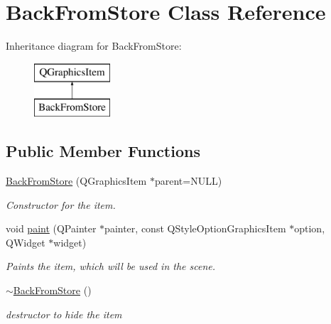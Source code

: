 \hypertarget{class_back_from_store}{\section{Back\-From\-Store Class Reference}
\label{class_back_from_store}
}
Inheritance diagram for Back\-From\-Store\-:\begin{figure}[H]
\begin{center}
\leavevmode
\includegraphics[height=2.000000cm]{class_back_from_store}
\end{center}
\end{figure}
\subsection*{Public Member Functions}
\begin{DoxyCompactItemize}
\item 
\hyperlink{class_back_from_store_a9e92e57e75e179d5929e13d7786bbae6}{Back\-From\-Store} (Q\-Graphics\-Item $\ast$parent=N\-U\-L\-L)
\begin{DoxyCompactList}\small\item\em Constructor for the item. \end{DoxyCompactList}\item 
void \hyperlink{class_back_from_store_a9bd0ae2bf7216a99e030a199df7b1582}{paint} (Q\-Painter $\ast$painter, const Q\-Style\-Option\-Graphics\-Item $\ast$option, Q\-Widget $\ast$widget)
\begin{DoxyCompactList}\small\item\em Paints the item, which will be used in the scene. \end{DoxyCompactList}\item 
\hypertarget{class_back_from_store_ad9766708c35f543f9b3ec96e0f96b75b}{\hyperlink{class_back_from_store_ad9766708c35f543f9b3ec96e0f96b75b}{$\sim$\-Back\-From\-Store} ()}\label{class_back_from_store_ad9766708c35f543f9b3ec96e0f96b75b}

\begin{DoxyCompactList}\small\item\em destructor to hide the item \end{DoxyCompactList}\end{DoxyCompactItemize}
